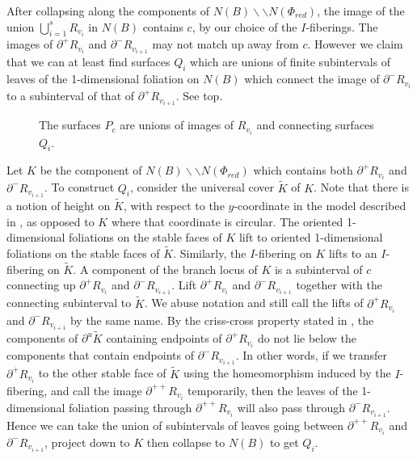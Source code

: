 \documentclass[12pt]{amsart}
\theoremstyle{definition}
\numberwithin{equation}{section}
\begin{document}
After collapsing along the components of $N(B) \backslash \backslash N(\Phi_{red})$, the image of the union $\bigcup_{i=1}^s R_{v_i}$ in $N(B)$ contains $c$, by our choice of the $I$-fiberings. The images of $\partial^+ R_{v_i}$ and $\partial^- R_{v_{i+1}}$ may not match up away from $c$. However we claim that we can at least find surfaces $Q_i$ which are unions of finite subintervals of leaves of the 1-dimensional foliation on $N(B)$ which connect the image of $\partial^- R_{v_i}$ to a subinterval of that of $\partial^+ R_{v_{i+1}}$. See  top.

\begin{figure}
    \centering
    \resizebox{!}{8cm}{}
    \caption{The surfaces $P_c$ are unions of images of $R_{v_i}$ and connecting surfaces $Q_i$.}
    \label{fig:stableglue3}
\end{figure}

Let $K$ be the component of $N(B) \backslash \backslash N(\Phi_{red})$ which contains both $\partial^+ R_{v_i}$ and $\partial^- R_{v_{i+1}}$. To construct $Q_i$, consider the universal cover $\widetilde{K}$ of $K$. Note that there is a notion of height on $\widetilde{K}$, with respect to the $y$-coordinate in the model described in , as opposed to $K$ where that coordinate is circular. The oriented 1-dimensional foliations on the stable faces of $K$ lift to oriented 1-dimensional foliations on the stable faces of $\widetilde{K}$. Similarly, the $I$-fibering on $K$ lifts to an $I$-fibering on $\widetilde{K}$. A component of the branch locus of $K$ is a subinterval of $c$ connecting up $\partial^+ R_{v_i}$ and $\partial^- R_{v_{i+1}}$. Lift $\partial^+ R_{v_i}$ and $\partial^- R_{v_{i+1}}$ together with the connecting subinterval to $\widetilde{K}$. We abuse notation and still call the lifts of $\partial^+ R_{v_i}$ and $\partial^- R_{v_{i+1}}$ by the same name. By the criss-cross property stated in , the components of $\partial^u \widetilde{K}$ containing endpoints of $\partial^+ R_{v_i}$ do not lie below the components that contain endpoints of $\partial^- R_{v_{i+1}}$. In other words, if we transfer $\partial^+ R_{v_i}$ to the other stable face of $\widetilde{K}$ using the homeomorphism induced by the $I$-fibering, and call the image $\partial^{++} R_{v_i}$ temporarily, then the leaves of the 1-dimensional foliation passing through $\partial^{++} R_{v_i}$ will also pass through $\partial^- R_{v_{i+1}}$. Hence we can take the union of subintervals of leaves going between $\partial^{++} R_{v_i}$ and $\partial^- R_{v_{i+1}}$, project down to $K$ then collapse to $N(B)$ to get $Q_i$.
\end{document}
